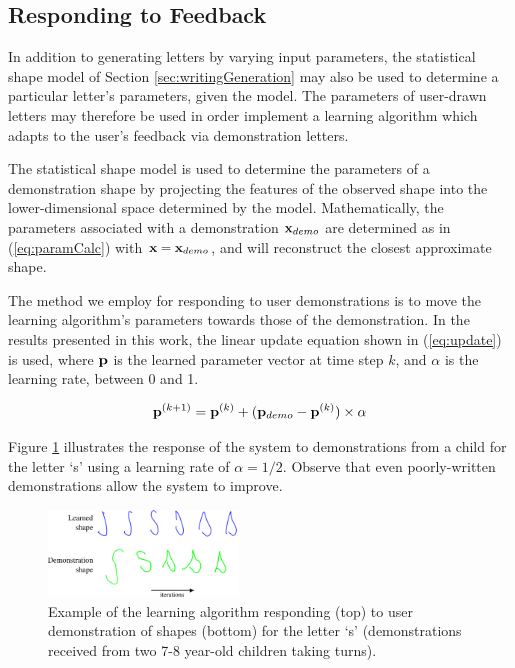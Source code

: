 \documentclass{sig-alternate}
\begin{document}
\subsection{Responding to Feedback}\label{sec:learningAlg}

In addition to generating letters by varying input parameters, the statistical 
shape model of Section \ref{sec:writingGeneration} may also be used 
to determine a particular letter's parameters, given the model. The parameters of user-drawn
letters may therefore be used in order implement a 
learning algorithm which adapts to the user's feedback via demonstration letters.

The statistical shape model is used to determine the parameters of a
demonstration shape by projecting the features of the observed shape into the
lower-dimensional space determined by the model. Mathematically, the parameters
associated with a demonstration ${\bf x}_{demo}$ are determined as in
(\ref{eq:paramCalc}) with ${\bf x}={\bf x}_{demo}$, and will reconstruct the 
closest approximate shape.

The method we employ for
responding to user demonstrations is to move the learning algorithm's parameters
towards those of the demonstration. In the results presented in this work, the
linear update equation shown in (\ref{eq:update}) is used, where ${\bf p}$ is the
learned parameter vector at time step $k$, and $\alpha$ is the learning rate,
between 0 and 1.  

\begin{equation}\label{eq:update}
{\bf p}^{(k+1)} = {\bf p}^{(k)} + ({\bf p}_{demo}-{\bf
p}^{(k)})\times\alpha
\end{equation}

Figure \ref{fig:demonstrationShapes2} illustrates the response of the system to
demonstrations from a child for the letter `s' using a learning rate of
$\alpha=1/2$. Observe that even poorly-written demonstrations allow the system to improve.

\begin{figure}[thpb]
    \centering
    \includegraphics[width=0.45\textwidth]{figures/learningSdemo}
    \caption{\label{fig:demonstrationShapes2}Example of the learning algorithm
    responding (top) to user demonstration of shapes (bottom) for the letter `s' (demonstrations received from two 7-8 year-old children taking turns).}
\end{figure}
\end{document}
